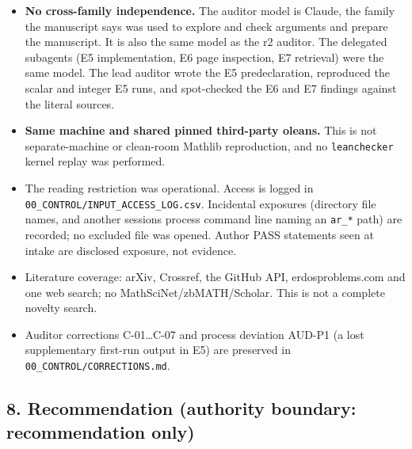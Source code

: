 \documentclass[
]{article}
\providecommand{\tightlist}{%
  \setlength{\itemsep}{0pt}\setlength{\parskip}{0pt}}
\begin{document}
\begin{itemize}
\tightlist
\item
  \textbf{No cross-family independence.} The auditor model is Claude,
  the family the manuscript says was used to explore and check arguments
  and prepare the manuscript. It is also the same model as the r2
  auditor. The delegated subagents (E5 implementation, E6 page
  inspection, E7 retrieval) were the same model. The lead auditor wrote
  the E5 predeclaration, reproduced the scalar and integer E5 runs, and
  spot-checked the E6 and E7 findings against the literal sources.
\item
  \textbf{Same machine and shared pinned third-party oleans.} This is
  not separate-machine or clean-room Mathlib reproduction, and no
  \texttt{leanchecker} kernel replay was performed.
\item
  The reading restriction was operational. Access is logged in
  \texttt{00\_CONTROL/INPUT\_ACCESS\_LOG.csv}. Incidental exposures
  (directory file names, and another session\textquotesingle s process
  command line naming an \texttt{ar\_*} path) are recorded; no excluded
  file was opened. Author PASS statements seen at intake are disclosed
  exposure, not evidence.
\item
  Literature coverage: arXiv, Crossref, the GitHub API,
  erdosproblems.com and one web search; no MathSciNet/zbMATH/Scholar.
  This is not a complete novelty search.
\item
  Auditor corrections C-01\ldots C-07 and process deviation AUD-P1 (a
  lost supplementary first-run output in E5) are preserved in
  \texttt{00\_CONTROL/CORRECTIONS.md}.
\end{itemize}

\subsection{8. Recommendation (authority boundary: recommendation
only)}\label{8-recommendation-authority-boundary-recommendation-only}
\end{document}
